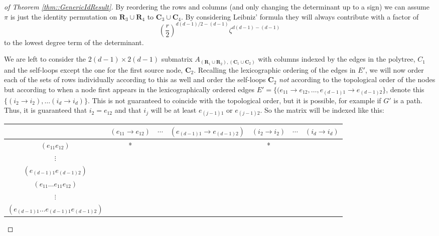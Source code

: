 \documentclass{biometrika}
\begin{document}
\begin{proof}[of Theorem \ref{thm::GenericIdResult}]
    By reordering the rows and columns (and only changing the determinant up to a sign) we can assume $\pi$ is just the identity permutation on  $\mathbf{R}_3 \cup \mathbf{R}_4$ to $\mathbf{C}_3 \cup \mathbf{C}_4$. By considering Leibniz' formula they will always contribute with a factor of 
    $$\left( \frac{r}{2} \right)^{d(d-1)/2 -(d-1)} \zeta^{d(d-1) -(d-1)}$$
    to the lowest degree term of the determinant. 

    We are left to consider the $2(d-1) \times 2(d-1)$ submatrix $A_{(\mathbf{R}_1 \cup \mathbf{R}_2), (\mathbf{C}_1 \cup \mathbf{C}_2)}$ with columns indexed by the edges in the polytree, $C_1$ and the self-loops except the one for the first source node, $\mathbf{C}_2$.
    Recalling the lexicographic ordering of the edges in $E'$, we will now order each of the sets of rows individually according to this as well and order the self-loops $\mathbf{C}_2$ \textit{not} according to the topological order of the nodes but according to when a node first appears in the lexicographically ordered edges $E' = \{ (e_{11} \rightarrow e_{12}, \dots, e_{(d-1) 1} \rightarrow e_{(d-1) 2} \}$, denote this $\{(i_2 \rightarrow i_2), \dots (i_d \rightarrow i_d) \}$. This is not guaranteed to coincide with the topological order, but it is possible, for example if $G'$ is a path. Thus, it is guaranteed that $i_2 = e_{12}$ and that $i_j$ will be at least $e_{(j-1) 1} $ or $e_{(j-1) 2}$. 
    So the matrix will be indexed like this: 


{\footnotesize
\begin{center}
\begin{NiceTabular}[ cell-space-limits=4pt]{ c | c c c c c c}
  & $(e_{11} \rightarrow e_{12}) $ & $\cdots$ & $(e_{(d-1) 1} \rightarrow e_{(d-1) 2})$ & $(i_2 \rightarrow i_2)$ & $\cdots$ & $(i_{d} \rightarrow i_{d})$ \\
  \hline 
 $(e_{11} e_{12})$ & *  &  & & *  \\  
 $\vdots$ &  &    \\ 
 $(e_{(d-1)1} e_{(d-1)2})$ \\ 
 $(e_{11} \dots  e_{11} e_{12})$ \\ 
 $\vdots$ \\
 $(e_{(d-1)1} \dots e_{(d-1) 1} e_{(d-1)2})$
\end{NiceTabular}
\end{center}
}


\end{proof}
\end{document}
